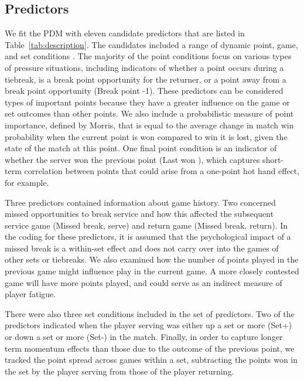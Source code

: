 \documentclass{Latex/svjour3}
\begin{document}
\subsection{Predictors}

We fit the PDM with eleven candidate predictors that are listed in
Table~\ref{tab:description}. The candidates included a range of dynamic point,
game, and set conditions . The
majority of the point conditions focus on various types of pressure situations,
including indicators of whether a point occurs during a tiebreak, is a break
point opportunity for the returner, or a point away from a break point
opportunity (Break point -1). These predictors can be considered types of
important points because they have a greater influence on the game or set
outcomes than other points. We also include a probabilistic measure of point
importance, defined by Morris\cite{morris1977most}, that is equal to the average
change in match win probability when the current point is won compared to win it
is lost, given the state of the match at this point. One final point condition
is an indicator of whether the server won the previous point (Last won
), which captures short-term
correlation between points that could arise from a one-point hot hand effect,
for example.

Three predictors contained information about game history. Two concerned missed
opportunities to break service and how this affected the subsequent service game
(Missed break, serve) and return game (Missed break, return). In the coding for
these predictors, it is assumed that the psychological impact of a missed break
is a within-set effect and does not carry over into the games of other sets or
tiebreaks.  We also examined how the number of points played in the previous
game might influence play in the current game. A more closely contested game
will have more points played, and could serve as an indirect measure of player
fatigue.

There were also three set conditions included in the set of predictors. Two of
the predictors indicated when the player serving was either up a set or more
(Set+) or down a set or more (Set-) in the match. Finally, in order to capture
longer term momentum effects than those due to the outcome of the previous
point, we tracked the point spread across games within a set, subtracting the
points won in the set by the player serving from those of the player returning.
\end{document}
